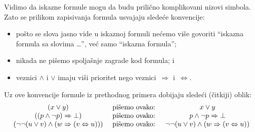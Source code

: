 \begin{CONVENTION}
  Vidimo da iskazne formule mogu da budu prili\v cno komplikovani nizovi simbola.
  Zato se prilikom zapisivanja formula usvajaju slede\'ce konvencije:
  \begin{itemize}
  \item
    po\v sto se slova jasno vide u iskaznoj formuli ne\'cemo vi\v se govoriti \enquote{iskazna formula sa slovima \ldots},
    ve\'c samo \enquote{iskazna formula};
  \item
    nikada ne pi\v semo spolja\v snje zagrade kod formula; i
  \item
    veznici $\land$ i $\lor$ imaju vi\v si prioritet nego veznici~$\Rightarrow$ i~$\Leftrightarrow$.
  \end{itemize}
\end{CONVENTION}

\begin{EX}
  Uz ove konvencije formule iz prethodnog primera dobijaju slede\'ci (\v citkiji) oblik:
  $$
    \begin{array}{c@{\quad\text{ pi\v semo ovako: }\quad}c}
      (x \lor y) & x \lor y\\
      ((p \land \lnot p) \Rightarrow \bot) & p \land \lnot p \Rightarrow \bot \\
      (\lnot \lnot(u \lor v) \land (w \Rightarrow (v \Leftrightarrow u)))
      & \lnot \lnot(u \lor v) \land (w \Rightarrow (v \Leftrightarrow u))
    \end{array}
  $$
\end{EX}

